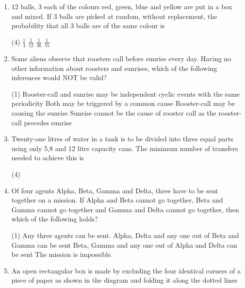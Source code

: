 \begin{enumerate}
\begin{figure}[H]
	\centering
	\texttt{[image: Net-19-5]}
\end{figure}
 \begin{tasks}(4)
\end{tasks}
\item  12 balls, 3 each of the colours red, green, blue and yellow are put in a box and mixed. If 3 balls are picked at random, without replacement, the probability that all 3 balls are of the same colour is
 \begin{tasks}(4)
	\task[\textbf{a.}]$\frac{1}{4}$
	\task[\textbf{b.}] $\frac{1}{12}$
	\task[\textbf{c.}]$\frac{1}{36}$
	\task[\textbf{d.}]$\frac{1}{55}$ 
\end{tasks}
\item  Some aliens observe that roosters call before sunrise every day. Having no other information about roosters and sunrises, which of the following inferences would NOT be valid?
 \begin{tasks}(1)
	\task[\textbf{a.}]Rooster-call and sunrise may be independent cyclic events with the same periodicity
	\task[\textbf{b.}]Both may be triggered by a common cause
	\task[\textbf{c.}]Rooster-call may be causing the sunrise
	\task[\textbf{d.}]Sunrise cannot be the cause of rooster call as the rooster-call precedes sunrise 
\end{tasks}
\item  Twenty-one litres of water in a tank is to be divided into three equal parts using only 5,8 and 12 litre capacity cans. The minimum number of transfers needed to achieve this is
 \begin{tasks}(4)
\end{tasks}
\item  Of four agents Alpha, Beta, Gamma and Delta, three have to be sent together on a mission. If Alpha and Beta cannot go together, Beta and Gamma cannot go together and Gamma and Delta cannot go together, then which of the following holds?
 \begin{tasks}(1)
	\task[\textbf{a.}]Any three agents can be sent.
	\task[\textbf{b.}]Alpha, Delta and any one out of Beta and Gamma can be sent
	\task[\textbf{c.}] Beta, Gamma and any one out of Alpha and Delta can be sent
	\task[\textbf{d.}] The mission is impossible.
\end{tasks}
\item  An open rectangular box is made by excluding the four identical corners of a piece of paper as shown in the diagram and folding it along the dotted lines

\end{enumerate}
